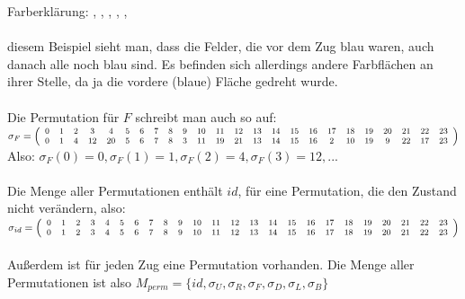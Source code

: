 \documentclass[12pt,a4paper, usenames, dvipsnames]{scrartcl}
\begin{document}
Farberklärung: \color{gray}{weiß}, \color{blue}{blau}, \color{ForestGreen}{grün}, \color{orange}{orange}, \color{black}{gelb}, \color{red}{rot}\\
\\
\color{black}{An} diesem Beispiel sieht man, dass die Felder, die vor dem Zug blau waren, auch danach alle noch blau sind. Es befinden sich allerdings andere Farbflächen an ihrer Stelle, da ja die vordere (blaue) Fläche gedreht wurde. \\
\\
Die Permutation für $F$ schreibt man auch so auf: \\
$\footnotesize
\sigma_F=
\left( \begin{array}{cccccccccccccccccccccccc}
0 & 1 & 2 & 3 & 4 & 5 & 6 & 7 & 8 & 9 & 10 & 11 & 12 & 13 & 14 & 15 & 16 & 17 &  18 & 19 & 20 & 21 &22 & 23 \\                                           
0 & 1 & 4 & 12 & 20 & 5 & 6 & 7 & 8 & 3 & 11 & 19 & 21 & 13 & 14 & 15 & 16 & 2 & 10 & 19 & 9 & 22 & 17 & 23 \\
\end{array}\right)$
Also: $\sigma_F(0) =0, \sigma_F(1)= 1, \sigma_F(2)=4, \sigma_F(3)=12,...$ \\
\\
Die Menge aller Permutationen enthält $id$, für eine Permutation, die den Zustand nicht verändern, also: \\
$\footnotesize
\sigma_{id}=
\left( \begin{array}{cccccccccccccccccccccccc}
0 & 1 & 2 & 3 & 4 & 5 & 6 & 7 & 8 & 9 & 10 & 11 & 12 & 13 & 14 & 15 & 16 & 17 &  18 & 19 & 20 & 21 &22 & 23 \\                                           
0 & 1 & 2 & 3 & 4 & 5 & 6 & 7 & 8 & 9 & 10 & 11 & 12 & 13 & 14 & 15 & 16 & 17 &  18 & 19 & 20 & 21 &22 & 23 \\                                           
\end{array}\right)$
\\
\\
Außerdem ist für jeden Zug eine Permutation vorhanden. Die Menge aller Permutationen ist also $M_{perm} = \lbrace id, \sigma_U, \sigma_R, \sigma_F, \sigma_D, \sigma_L, \sigma_B \rbrace$


\end{document}
